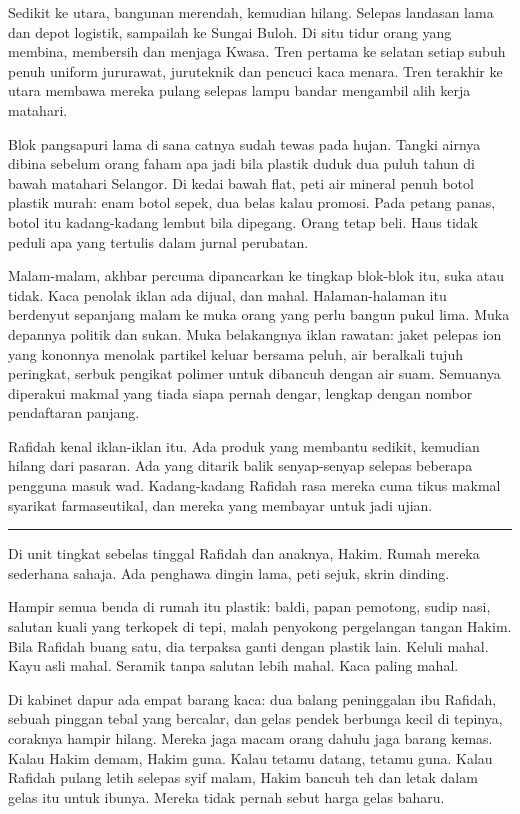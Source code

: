 \documentclass[
  11pt,
  a5paper,
  openany,
  oneside]{book}
\begin{document}
Sedikit ke utara, bangunan merendah, kemudian hilang. Selepas landasan
lama dan depot logistik, sampailah ke Sungai Buloh. Di situ tidur orang
yang membina, membersih dan menjaga Kwasa. Tren pertama ke selatan
setiap subuh penuh uniform jururawat, juruteknik dan pencuci kaca
menara. Tren terakhir ke utara membawa mereka pulang selepas lampu
bandar mengambil alih kerja matahari.

Blok pangsapuri lama di sana catnya sudah tewas pada hujan. Tangki
airnya dibina sebelum orang faham apa jadi bila plastik duduk dua puluh
tahun di bawah matahari Selangor. Di kedai bawah flat, peti air mineral
penuh botol plastik murah: enam botol sepek, dua belas kalau promosi.
Pada petang panas, botol itu kadang-kadang lembut bila dipegang. Orang
tetap beli. Haus tidak peduli apa yang tertulis dalam jurnal perubatan.

Malam-malam, akhbar percuma dipancarkan ke tingkap blok-blok itu, suka
atau tidak. Kaca penolak iklan ada dijual, dan mahal. Halaman-halaman
itu berdenyut sepanjang malam ke muka orang yang perlu bangun pukul
lima. Muka depannya politik dan sukan. Muka belakangnya iklan rawatan:
jaket pelepas ion yang kononnya menolak partikel keluar bersama peluh,
air beralkali tujuh peringkat, serbuk pengikat polimer untuk dibancuh
dengan air suam. Semuanya diperakui makmal yang tiada siapa pernah
dengar, lengkap dengan nombor pendaftaran panjang.

Rafidah kenal iklan-iklan itu. Ada produk yang membantu sedikit,
kemudian hilang dari pasaran. Ada yang ditarik balik senyap-senyap
selepas beberapa pengguna masuk wad. Kadang-kadang Rafidah rasa mereka
cuma tikus makmal syarikat farmaseutikal, dan mereka yang membayar untuk
jadi ujian.

\begin{center}\rule{0.5\linewidth}{0.5pt}\end{center}

Di unit tingkat sebelas tinggal Rafidah dan anaknya, Hakim. Rumah mereka
sederhana sahaja. Ada penghawa dingin lama, peti sejuk, skrin dinding.

Hampir semua benda di rumah itu plastik: baldi, papan pemotong, sudip
nasi, salutan kuali yang terkopek di tepi, malah penyokong pergelangan
tangan Hakim. Bila Rafidah buang satu, dia terpaksa ganti dengan plastik
lain. Keluli mahal. Kayu asli mahal. Seramik tanpa salutan lebih mahal.
Kaca paling mahal.

Di kabinet dapur ada empat barang kaca: dua balang peninggalan ibu
Rafidah, sebuah pinggan tebal yang bercalar, dan gelas pendek berbunga
kecil di tepinya, coraknya hampir hilang. Mereka jaga macam orang dahulu
jaga barang kemas. Kalau Hakim demam, Hakim guna. Kalau tetamu datang,
tetamu guna. Kalau Rafidah pulang letih selepas syif malam, Hakim bancuh
teh dan letak dalam gelas itu untuk ibunya. Mereka tidak pernah sebut
harga gelas baharu.
\end{document}
